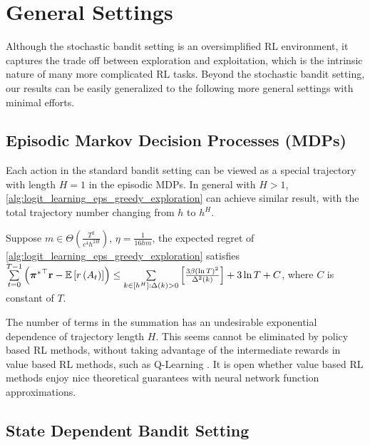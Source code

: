 \section{General Settings}
\label{sec:general_settings}
Although the stochastic bandit setting is an oversimplified RL environment, it captures the trade off between exploration and exploitation, which is the intrinsic nature of many more complicated RL tasks. Beyond the stochastic bandit setting, our results can be easily generalized to the following more general settings with minimal efforts.

\subsection{Episodic Markov Decision Processes (MDPs)}

Each action in the standard bandit setting can be viewed as a special trajectory with length $H = 1$ in the episodic MDPs. In general with $H > 1$, \cref{alg:logit_learning_eps_greedy_exploration} can achieve similar result, with the total trajectory number changing from $h$ to $h^H$.
\begin{thm}
\label{thm:episodic_mdp_setting}
     Suppose $m \in \Theta\left( \frac{T^2}{c^4 h^{2H}} \right)$, $\eta = \frac{ 1 }{16 h m}$, the expected regret of \cref{alg:logit_learning_eps_greedy_exploration} satisfies $\sum\limits_{t=0}^{T-1}{ \left( {{\boldsymbol{\pi}}^*}^\top {\mathbf{r}} - {\mathbb{E}} \left[ r\left(A_t\right) \right] \right) } \le \sum\limits_{k \in [h^H] : \Delta(k) > 0}{ \left[ \frac{ 3 \beta \left( \ln{T} \right)^2}{\Delta^2(k)} \right] } + 3 \ln{T} + C$, where $C$ is constant of $T$.
\end{thm}

The number of terms in the summation has an undesirable exponential dependence of trajectory length $H$. This seems cannot be eliminated by policy based RL methods, without taking advantage of the intermediate rewards in value based RL methods, such as Q-Learning \citep{jin2018q}. It is open whether value based RL methods enjoy nice theoretical guarantees with neural network function approximations.

\subsection{State Dependent Bandit Setting}

